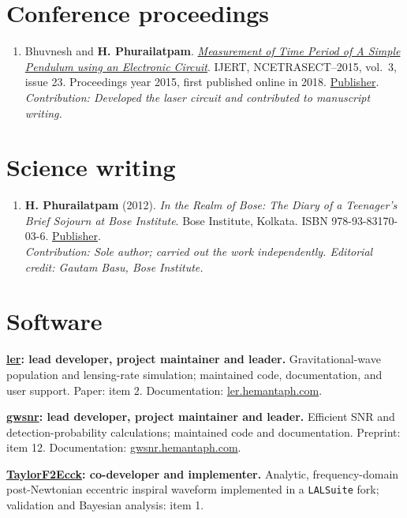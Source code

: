 \documentclass[11pt]{article}
\begin{document}
\section*{Conference proceedings}
\begin{enumerate}[start=14]
\item Bhuvnesh and \textbf{H. Phurailatpam}. \href{https://www.ijert.org/measurement-of-time-period-of-a-simple-pendulum-using-an-electronic-circuit}{\textit{Measurement of Time Period of A Simple Pendulum using an Electronic Circuit}}. IJERT, NCETRASECT--2015, vol.\ 3, issue 23. Proceedings year 2015, first published online in 2018. \href{https://www.ijert.org/measurement-of-time-period-of-a-simple-pendulum-using-an-electronic-circuit}{Publisher}.\\\emph{Contribution: Developed the laser circuit and contributed to manuscript writing.}
\end{enumerate}
\section*{Science writing}
\begin{enumerate}[start=15]
\item \textbf{H. Phurailatpam} (2012). \textit{In the Realm of Bose: The Diary of a Teenager's Brief Sojourn at Bose Institute}. Bose Institute, Kolkata. ISBN 978-93-83170-03-6. \href{https://jcbose.ac.in/publication}{Publisher}.\\\emph{Contribution: Sole author; carried out the work independently. Editorial credit: Gautam Basu, Bose Institute.}
\end{enumerate}
\section*{Software}
\textbf{\href{https://ler.hemantaph.com/}{ler}: lead developer, project maintainer and leader.} Gravitational-wave population and lensing-rate simulation; maintained code, documentation, and user support. Paper: item 2. Documentation: \href{https://ler.hemantaph.com/}{ler.hemantaph.com}.

\textbf{\href{https://gwsnr.hemantaph.com/}{gwsnr}: lead developer, project maintainer and leader.} Efficient SNR and detection-probability calculations; maintained code and documentation. Preprint: item 12. Documentation: \href{https://gwsnr.hemantaph.com/}{gwsnr.hemantaph.com}.

\textbf{\href{https://arxiv.org/abs/2508.12697}{TaylorF2Ecck}: co-developer and implementer.} Analytic, frequency-domain post-Newtonian eccentric inspiral waveform implemented in a \texttt{LALSuite} fork; validation and Bayesian analysis: item 1.
\end{document}
